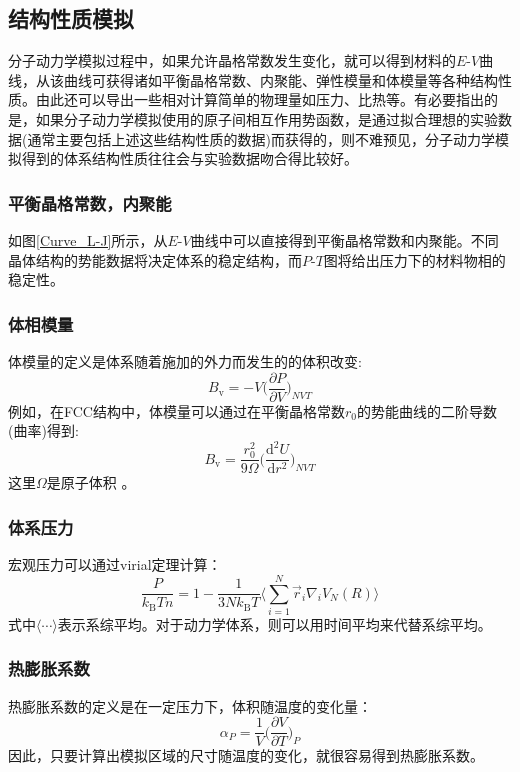 \subsection{结构性质模拟}
分子动力学模拟过程中，如果允许晶格常数发生变化，就可以得到材料的$E$-$V$曲线，从该曲线可获得诸如平衡晶格常数、内聚能、弹性模量和体模量等各种结构性质。由此还可以导出一些相对计算简单的物理量如压力、比热等。有必要指出的是，如果分子动力学模拟使用的原子间相互作用势函数，是通过拟合理想的实验数据(通常主要包括上述这些结构性质的数据)而获得的，则不难预见，分子动力学模拟得到的体系结构性质往往会与实验数据吻合得比较好。
\subsubsection{平衡晶格常数，内聚能}
如图\ref{Curve_L-J}所示，从$E$-$V$曲线中可以直接得到平衡晶格常数和内聚能。不同晶体结构的势能数据将决定体系的稳定结构，而$P$-$T$图将给出压力下的材料物相的稳定性。
\subsubsection{体相模量}
体模量的定义是体系随着施加的外力而发生的的体积改变:
\begin{equation}
	B_{\mathrm{v}}=-V\bigg(\dfrac{\partial P}{\partial V}\bigg)_{NVT}
	\label{eq:Bulk-modulus}
\end{equation}
例如，在\textrm{FCC}结构中，体模量可以通过在平衡晶格常数$r_0$的势能曲线的二阶导数(曲率)得到:
\begin{equation}
	B_{\mathrm{v}}=\dfrac{r_0^2}{9\Omega}\bigg(\dfrac{\mathrm{d}^2U}{\mathrm{d}r^2}\bigg)_{NVT}
	\label{eq:Bulk-modulus-2}
\end{equation}
这里$\Omega$是原子体积%
。
\subsubsection{体系压力}
宏观压力可以通过\textrm{virial}定理\cite{Hansen-McDonald}计算：
\begin{equation}
	\dfrac{P}{k_{\mathrm{B}}Tn}=1-\dfrac1{3Nk_{\mathrm{B}}T}\bigg\langle\sum_{i=1}^N\vec r_i\nabla_iV_N(R)\bigg\rangle
	\label{eq:P-virial-theorem}
\end{equation}
式中$\langle\cdots\rangle$表示系综平均。对于动力学体系，则可以用时间平均来代替系综平均。
\subsubsection{热膨胀系数}
热膨胀系数的定义是在一定压力下，体积随温度的变化量：
\begin{equation}
	\alpha_P=\dfrac1V\bigg(\dfrac{\partial V}{\partial T}\bigg)_P
	\label{eq:expansion-coefficient}
\end{equation}
因此，只要计算出模拟区域的尺寸随温度的变化，就很容易得到热膨胀系数。
